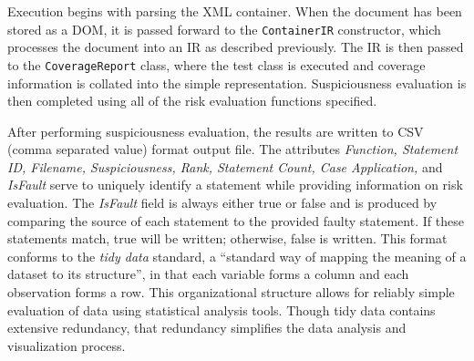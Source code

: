 Execution begins with parsing the XML container.  When the document has been stored as a DOM, it is
passed forward to the \texttt{ContainerIR} constructor, which processes the document into an IR as
described previously.  The IR is then passed to the \texttt{CoverageReport} class, where the 
test class is executed and coverage information is collated into the simple representation.
Suspiciousness evaluation is then completed using all of the risk evaluation functions specified.

After performing suspiciousness evaluation, the results are written to CSV (comma
separated value) format output file.  The attributes \textit{Function, Statement ID, Filename, Suspiciousness, Rank,
Statement Count, Case Application,} and \textit{IsFault} serve to uniquely identify a statement 
while providing information on risk evaluation.  The \textit{IsFault} field is always either true or 
false and is produced by comparing the source of each statement to the provided faulty statement. 
If these statements match, true will be written; otherwise, false is written.
This format conforms to the \textit{tidy data} \cite{tidy} standard, a ``standard way of mapping the meaning of a 
dataset to its structure'', in that each variable forms a column and each observation forms a row.  
This organizational structure allows for reliably simple evaluation of data using statistical 
analysis tools.  Though tidy data contains extensive redundancy, that redundancy simplifies
the data analysis and visualization process.

